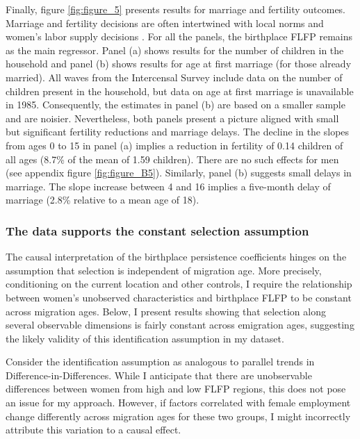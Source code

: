 Finally, figure \ref{fig:figure_5} presents results for marriage and fertility outcomes. Marriage and fertility decisions are often intertwined with local norms and women's labor supply decisions \citep{Fernandez2009,Jayachandran2021}. For all the panels, the birthplace FLFP remains as the main regressor.  Panel (a) shows results for the number of children in the household and panel (b) shows results for age at first marriage (for those already married). All waves from the Intercensal Survey include data on the number of children present in the household, but data on age at first marriage is unavailable in 1985. Consequently, the estimates in panel (b) are based on a smaller sample and are noisier. Nevertheless, both panels present a picture aligned with small but significant fertility reductions and marriage delays. The decline in the slopes from ages 0 to 15 in panel (a) implies a reduction in fertility of 0.14 children of all ages (8.7\% of the mean of 1.59 children). There are no such effects for men (see appendix figure \ref{fig:figure_B5}). Similarly, panel (b) suggests small delays in marriage.   The slope increase between 4 and 16 implies a five-month delay of marriage (2.8\% relative to a mean age of 18).




\subsubsection{The data supports the constant selection assumption}

The causal interpretation of the birthplace persistence coefficients hinges on the assumption that selection is independent of migration age. More precisely, conditioning on the current location and other controls, I require the relationship between women's unobserved characteristics and birthplace FLFP to be constant across migration ages. Below, I present results showing that selection along several observable dimensions is fairly constant across emigration ages, suggesting the likely validity of this identification assumption in my dataset.


Consider the identification assumption as analogous to parallel trends in Difference-in-Differences. While I anticipate that there are unobservable differences between women from high and low FLFP regions, this does not pose an issue for my approach. However, if factors correlated with female employment change differently across migration ages for these two groups, I might incorrectly attribute this variation to a causal effect. %



